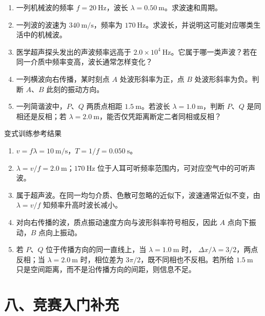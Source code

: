 \begin{enumerate}
  \item 一列机械波的频率 $f=20\ \mathrm{Hz}$，波长 $\lambda=0.50\ \mathrm{m}$。求波速和周期。

  \item 一列波的波速为 $340\ \mathrm{m/s}$，频率为 $170\ \mathrm{Hz}$。求波长，并说明这可能对应哪类生活中的机械波。

  \item 医学超声探头发出的声波频率远高于 $2.0\times10^4\ \mathrm{Hz}$。它属于哪一类声波？若在同一介质中频率变高，波长通常怎样变化？

  \item 一列横波向右传播，某时刻点 $A$ 处波形斜率为正，点 $B$ 处波形斜率为负。判断 $A$、$B$ 此刻的振动方向。
  \begin{center}
  
  \end{center}

  \item 一列简谐波中，$P$、$Q$ 两质点相距 $1.5\ \mathrm{m}$。若波长 $\lambda=1.0\ \mathrm{m}$，判断 $P$、$Q$ 是同相还是反相；若 $\lambda=2.0\ \mathrm{m}$，能否仅凭距离断定二者同相或反相？
\end{enumerate}

\begin{learningbox}{变式训练参考结果}
\begin{enumerate}[itemsep=0.45em,topsep=0.3em,parsep=0pt]
  \item $v=f\lambda=10\ \mathrm{m/s}$，$T=1/f=0.050\ \mathrm s$。
  \item $\lambda=v/f=2.0\ \mathrm m$；$170\ \mathrm{Hz}$ 位于人耳可听频率范围内，可对应空气中的可听声波。
  \item 属于超声波。在同一均匀介质、色散可忽略的近似下，波速通常近似不变，由 $\lambda=v/f$ 知频率升高时波长减小。
  \item 对向右传播的波，质点振动速度方向与波形斜率符号相反，因此 $A$ 点向下振动，$B$ 点向上振动。
  \item 若 $P$、$Q$ 位于传播方向的同一直线上，当 $\lambda=1.0\ \mathrm m$ 时，
  $\Delta x/\lambda=3/2$，两点反相；当 $\lambda=2.0\ \mathrm m$ 时，相位差为
  $3\pi/2$，既不同相也不反相。若所给 $1.5\ \mathrm m$ 只是空间距离，而不是沿传播方向的间距，则信息不足。
\end{enumerate}
\end{learningbox}

\section*{八、竞赛入门补充}


